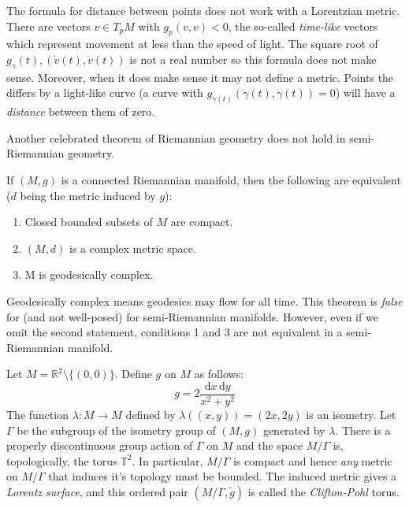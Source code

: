\documentclass{beamer}
\begin{document}
    \begin{frame}
        The formula for distance between points does not work with a Lorentzian
        metric. There are vectors $v\in{T}_{p}M$ with
        $g_{p}(v,v)<0$, the so-called \textit{time-like} vectors which
        represent movement at less than the speed of light. The square root of
        $g_{\gamma}(t),(\dot{v}(t),\dot{v}(t))$ is not a real number so this formula
        does not make sense. Moreover, when it does make sense it may not define
        a metric. Points the differs by a light-like curve (a curve with
        $g_{\gamma(t)}(\dot{\gamma}(t),\dot{\gamma}(t))=0$) will have a
        \textit{distance} between them of zero.
    \end{frame}
    \begin{frame}
        Another celebrated theorem of Riemannian geometry does not hold in
        semi-Riemannian geometry.
        \begin{theorem}
            If $(M,g)$ is a connected Riemannian manifold, then the following
            are equivalent ($d$ being the metric induced by $g$):
            \begin{enumerate}
                \item Closed bounded subsets of $M$ are compact.
                \item $(M,d)$ is a complex metric space.
                \item M is geodesically complex.
            \end{enumerate}
        \end{theorem}
        Geodesically complex means geodesics may flow for all time. This theorem
        is \textit{false} for (and not well-posed) for semi-Riemannian
        manifolds. However, even if we omit the second statement, conditions
        1 and 3 are not equivalent in a semi-Riemannian manifold.
    \end{frame}
    \begin{frame}
        Let $M=\mathbb{R}^{2}\setminus\{(0,0)\}$. Define $g$ on $M$ as follows:
        \begin{equation}
            g=2\frac{\textrm{d}x\,\textrm{d}y}{x^{2}+y^{2}}
        \end{equation}
        The function $\lambda:M\rightarrow{M}$ defined by
        $\lambda((x,y))=(2x,2y)$ is an isometry. Let $\Gamma$ be the subgroup
        of the isometry group of $(M,g)$ generated by $\lambda$. There is a
        properly discontinuous group action of $\Gamma$ on $M$ and the space
        $M/\Gamma$ is, topologically, the torus $\mathbb{T}^{2}$. In particular,
        $M/\Gamma$ is compact and hence \textit{any} metric on $M/\Gamma$ that
        induces it's topology must be bounded. The induced metric gives a
        \textit{Lorentz surface}, and this ordered pair
        $(M/\Gamma,\tilde{g})$ is called the
        \textit{Clifton-Pohl} torus.
    \end{frame}
\end{document}
